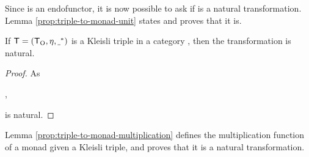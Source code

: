 Since  is an endofunctor, it is now possible to ask if
\nat{\eta} is a natural transformation. Lemma
\ref{prop:triple-to-monad-unit} states and proves that it is.

\begin{proposition}
  \label{prop:triple-to-monad-unit}

  If $\mathsf{T} = (\mathsf{T}_{\operatorname{O}}, \eta, \underline{~}^*)$ is a Kleisli triple in
  a category , then the transformation \nat{\eta} is natural.

  \begin{proof}

    As
    \begin{steps}
      ,
    \end{steps}
    \nat{\eta} is natural.

  \end{proof}

\end{proposition}

Lemma \ref{prop:triple-to-monad-multiplication} defines the
multiplication function of a monad given a Kleisli triple, and proves that it
is a natural transformation.

